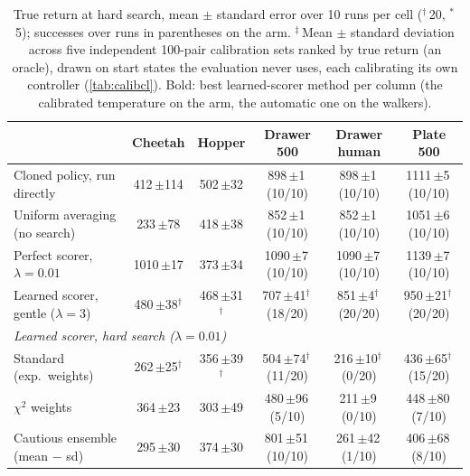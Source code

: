 \begin{table}[t]
\centering
\caption{True return at hard search, mean $\pm$ standard error over 10 runs per cell ($^\dagger$\,20, $^\ast$\,5); successes over runs in parentheses on the arm. $^\ddagger$\,Mean $\pm$ standard deviation across five independent 100-pair calibration sets ranked by true return (an oracle), drawn on start states the evaluation never uses, each calibrating its own controller (\cref{tab:calibcl}). Bold: best learned-scorer method per column (the calibrated temperature on the arm, the automatic one on the walkers).}
\label{tab:fixes}
\small
\begin{tabular}{lccccc}
\toprule
& Cheetah & Hopper & Drawer 500 & Drawer human & Plate 500 \\
\midrule
Cloned policy, run directly & 412\,{\scriptsize$\pm$114} & 502\,{\scriptsize$\pm$32} & 898\,{\scriptsize$\pm$1}\,(10/10) & 898\,{\scriptsize$\pm$1}\,(10/10) & 1111\,{\scriptsize$\pm$5}\,(10/10) \\
Uniform averaging (no search) & 233\,{\scriptsize$\pm$78} & 418\,{\scriptsize$\pm$38} & 852\,{\scriptsize$\pm$1}\,(10/10) & 852\,{\scriptsize$\pm$1}\,(10/10) & 1051\,{\scriptsize$\pm$6}\,(10/10) \\
Perfect scorer, $\lambda=0.01$ & 1010\,{\scriptsize$\pm$17} & 373\,{\scriptsize$\pm$34} & 1090\,{\scriptsize$\pm$7}\,(10/10) & 1090\,{\scriptsize$\pm$7}\,(10/10) & 1139\,{\scriptsize$\pm$7}\,(10/10) \\
Learned scorer, gentle ($\lambda=3$) & 480\,{\scriptsize$\pm$38}$^\dagger$ & 468\,{\scriptsize$\pm$31}$^\dagger$ & 707\,{\scriptsize$\pm$41}$^\dagger$\,(18/20) & 851\,{\scriptsize$\pm$4}$^\dagger$\,(20/20) & 950\,{\scriptsize$\pm$21}$^\dagger$\,(20/20) \\
\midrule
\multicolumn{6}{l}{\emph{Learned scorer, hard search ($\lambda = 0.01$)}} \\
Standard (exp.\ weights) & 262\,{\scriptsize$\pm$25}$^\dagger$ & 356\,{\scriptsize$\pm$39}$^\dagger$ & 504\,{\scriptsize$\pm$74}$^\dagger$\,(11/20) & 216\,{\scriptsize$\pm$10}$^\dagger$\,(0/20) & 436\,{\scriptsize$\pm$65}$^\dagger$\,(15/20) \\
$\chi^2$ weights & 364\,{\scriptsize$\pm$23} & 303\,{\scriptsize$\pm$49} & 480\,{\scriptsize$\pm$96}\,(5/10) & 211\,{\scriptsize$\pm$9}\,(0/10) & 448\,{\scriptsize$\pm$80}\,(7/10) \\
Cautious ensemble (mean $-$ sd) & 295\,{\scriptsize$\pm$30} & 374\,{\scriptsize$\pm$30} & 801\,{\scriptsize$\pm$51}\,(10/10) & 261\,{\scriptsize$\pm$42}\,(1/10) & 406\,{\scriptsize$\pm$68}\,(8/10) \\

\end{tabular}
\end{table}

